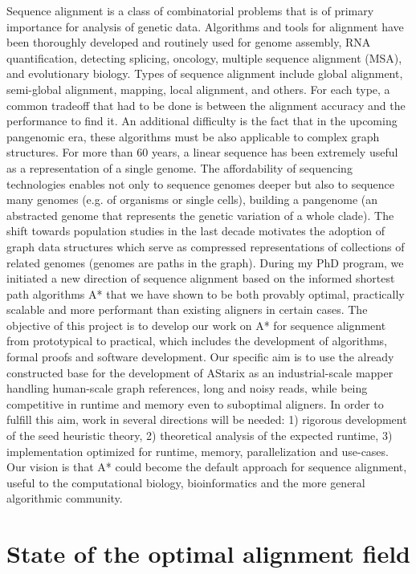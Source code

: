 Sequence alignment is a class of combinatorial problems that is of primary
importance for analysis of genetic data. Algorithms and tools for alignment have
been thoroughly developed and routinely used for genome assembly, RNA
quantification, detecting splicing, oncology, multiple sequence alignment (MSA),
and evolutionary biology. Types of sequence alignment include global alignment,
semi-global alignment, mapping, local alignment, and others. For each type, a
common tradeoff that had to be done is between the alignment accuracy and the
performance to find it. An additional difficulty is the fact that in the
upcoming pangenomic era, these algorithms must be also applicable to complex
graph structures. For more than 60 years, a linear sequence has been extremely
useful as a representation of a single genome. The affordability of sequencing
technologies enables not only to sequence genomes deeper but also to sequence
many genomes (e.g. of organisms or single cells), building a pangenome (an
abstracted genome that represents the genetic variation of a whole clade). The
shift towards population studies in the last decade motivates the adoption of
graph data structures which serve as compressed representations of collections
of related genomes (genomes are paths in the graph). During my PhD program, we
initiated a new direction of sequence alignment based on the informed shortest
path algorithms A* that we have shown to be both provably optimal, practically
scalable and more performant than existing aligners in certain cases. The
objective of this project is to develop our work on A* for sequence alignment
from prototypical to practical, which includes the development of algorithms,
formal proofs and software development. Our specific aim is to use the already
constructed base for the development of AStarix as an industrial-scale mapper
handling human-scale graph references, long and noisy reads, while being
competitive in runtime and memory even to suboptimal aligners. In order to
fulfill this aim, work in several directions will be needed: 1) rigorous
development of the seed heuristic theory, 2) theoretical analysis of the
expected runtime, 3) implementation optimized for runtime, memory,
parallelization and use-cases. Our vision is that A* could become the default
approach for sequence alignment, useful to the computational biology,
bioinformatics and the more general algorithmic community.




\section{State of the optimal alignment field}

